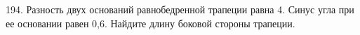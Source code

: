 194. Разность двух оснований равнобедренной трапеции равна 4. Синус угла при ее основании равен 0,6. Найдите длину боковой стороны трапеции.\\
